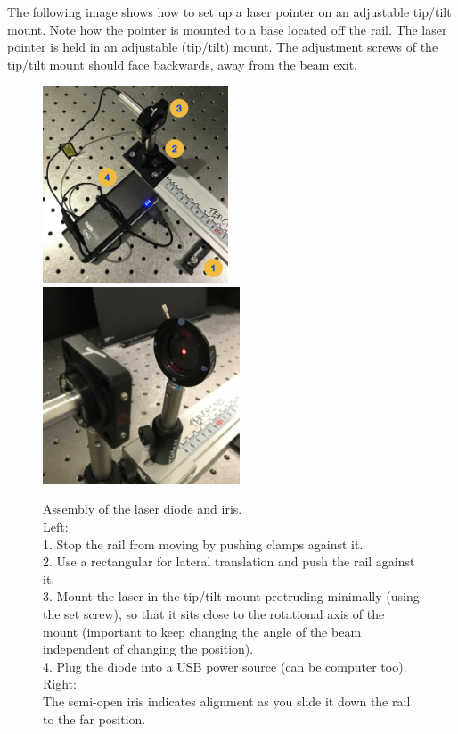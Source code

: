 \documentclass[a4paper]{report}
\begin{document}
	The following image shows how to set up a laser pointer on an adjustable tip/tilt mount. 
	Note how the pointer is mounted to a base located off the rail. 
	The laser pointer is held in an adjustable (tip/tilt) mount.
	The adjustment screws of the tip/tilt mount should face backwards, away from the beam exit.
	

	\begin{figure}[h]
		\center
		\includegraphics[width=2.17in]{figures/laser_diode.png}
		\includegraphics[width=2.3in]{figures/laser_diode_iris.jpg}
		\captionsetup{width=0.9\textwidth}
		\caption{Assembly of the laser diode and iris. \\
		Left: \\
		1. Stop the rail from moving by pushing clamps against it. \\
		2. Use a rectangular for lateral translation and push the rail against it. \\
		3. Mount the laser in the tip/tilt mount protruding minimally (using the set screw), so that it sits close to the rotational axis of the mount (important to keep changing the angle of the beam independent of changing the position). \\
		4. Plug the diode into a USB power source (can be computer too). \\
		Right: \\
		The semi-open iris indicates alignment as you slide it down the rail to the far position.}
		\label{fig:post}
	\end{figure}
	
	

	
\end{document}
